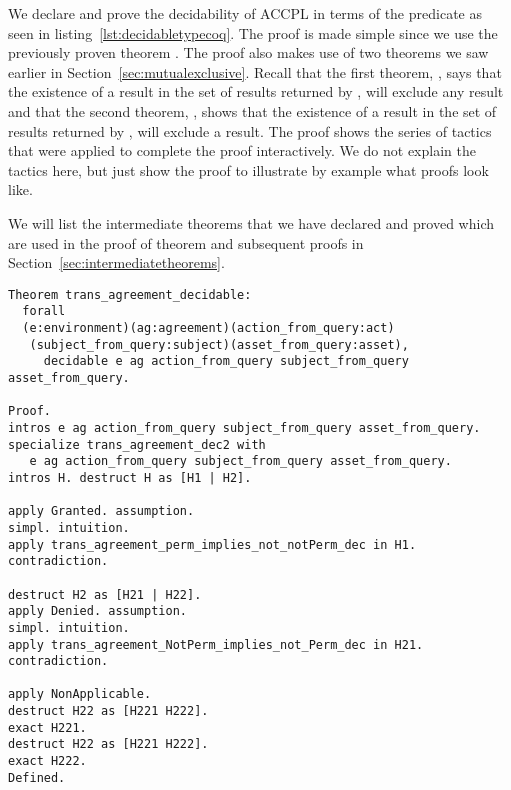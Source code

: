 We declare and prove the decidability of \ac{ACCPL} in terms of the  predicate as seen in listing~\ref{lst:decidabletypecoq}. The proof is made simple since we use the previously proven theorem . The proof also makes use of two theorems we saw earlier in Section~\ref{sec:mutualexclusive}. Recall that the first theorem, , says that the existence of a  result in the set of results returned by , will exclude any  result and that the second theorem, , shows that the existence of a  result in the set of results returned by , will exclude a  result. The proof shows the series of tactics that were applied to 
complete the proof interactively. We do not explain the tactics here, but just show the proof to illustrate by example what proofs look like.

We will list the intermediate theorems that we have declared and proved which are used in the proof of theorem  and subsequent proofs in Section~\ref{sec:intermediatetheorems}.

\begin{lstlisting}
Theorem trans_agreement_decidable:
  forall
  (e:environment)(ag:agreement)(action_from_query:act)
   (subject_from_query:subject)(asset_from_query:asset),
     decidable e ag action_from_query subject_from_query asset_from_query.

Proof.
intros e ag action_from_query subject_from_query asset_from_query.
specialize trans_agreement_dec2 with 
   e ag action_from_query subject_from_query asset_from_query.
intros H. destruct H as [H1 | H2].

apply Granted. assumption.
simpl. intuition.
apply trans_agreement_perm_implies_not_notPerm_dec in H1. contradiction. 

destruct H2 as [H21 | H22].
apply Denied. assumption.
simpl. intuition.
apply trans_agreement_NotPerm_implies_not_Perm_dec in H21. contradiction. 

apply NonApplicable. 
destruct H22 as [H221 H222].
exact H221.
destruct H22 as [H221 H222].
exact H222.
Defined.
\end{lstlisting}

